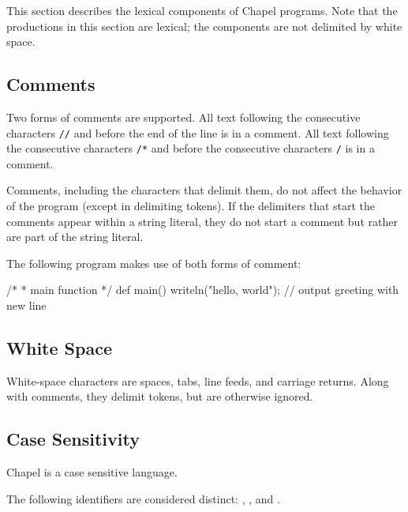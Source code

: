 \label{Lexical_Structure}

This section describes the lexical components of Chapel programs.
Note that the productions in this section are lexical; the components
are not delimited by white space.

\subsection{Comments}
\label{Comments}

Two forms of comments are supported.  All text following the
consecutive characters {\tt //} and before the end of the line is in a
comment.  All text following the consecutive characters {\tt /*} and
before the consecutive characters {\tt */} is in a comment.

Comments, including the characters that delimit them, do not affect
the behavior of the program (except in delimiting tokens).  If the
delimiters that start the comments appear within a string literal,
they do not start a comment but rather are part of the string literal.

\begin{example}
The following program makes use of both forms of comment:
\begin{chapel}
/*
 *  main function
 */
def main() {
  writeln("hello, world"); // output greeting with new line
}
\end{chapel}
\end{example}

\subsection{White Space}
\label{White_Space}

White-space characters are spaces, tabs, line feeds, and carriage
returns.  Along with comments, they delimit tokens, but are otherwise
ignored.

\subsection{Case Sensitivity}
\label{Case_Sensitivity}

Chapel is a case sensitive language.

\begin{example}
The following identifiers are considered
distinct: , , and .
\end{example}

